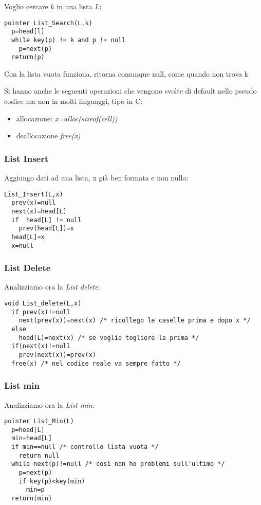 \documentclass[a4paper,12pt,oneside,tikz]{book}
\begin{document}
\begin{esempio}
Voglio cercare $k$ in una lista $L$:
\begin{verbatim}
pointer List_Search(L,k)
  p=head[l]
  while key(p) != k and p != null
    p=next(p)
  return(p)
\end{verbatim}
Con la lista vuota funziona, ritorna comunque null, come quando non trova k
\end{esempio}
Si hanno anche le seguenti operazioni che vengono svolte di default nello pseudo codice ma non in molti linguaggi, tipo in C:
\begin{itemize}
\item allocazione: \textit{x=alloc(sizeof(cell))}
\item deallocazione \textit{free(x)}
\end{itemize}
\newpage
\subsubsection{List Insert}
Aggiungo dati ad una lista, x già ben formata e non nulla:
\begin{verbatim}
List_Insert(L,x)
  prev(x)=null
  next(x)=head[L]
  if  head[L] != null
    prev(head[L])=x 
  head[L]=x
  x=null
\end{verbatim}

\subsubsection{List Delete}
Analizziamo ora la \textit{List delete}:
\begin{verbatim}
void List_delete(L,x)
  if prev(x)!=null
    next(prev(x))=next(x) /* ricollego le caselle prima e dopo x */
  else
    head(L)=next(x) /* se voglio togliere la prima */
  if(next(x)!=null
    prev(next(x))=prev(x)
  free(x) /* nel codice reale va sempre fatto */
\end{verbatim}
\subsubsection{List min}
Analizziamo ora la \textit{List min}:
\begin{verbatim}
pointer List_Min(L)
  p=head[L]
  min=head[L]
  if min==null /* controllo lista vuota */
    return null
  while next(p)!=null /* così non ho problemi sull'ultimo */
    p=next(p)
    if key(p)<key(min)
      min=p
  return(min)
\end{verbatim}

\newpage
\end{document}
